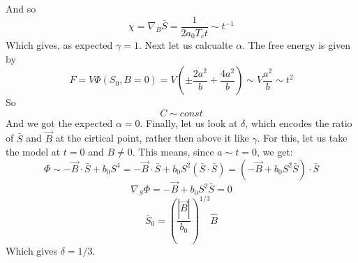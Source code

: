 \documentclass{article}
\begin{document}
And so
\begin{equation}
    \chi = \nabla_{B}\bar{S} = \frac{1}{2a_0T_c t} \sim t^{-1}
\end{equation}
Which gives, as expected $\gamma = 1$. Next let us calcualte $\alpha$. The free energy is given by
\begin{equation}
    F = V \Phi(S_0, B=0) = V\left(\pm \frac{2a^2}{b} + \frac{4a^2}{b}\right) \sim V\frac{a^2}{b} \sim t^2
\end{equation}
So
\begin{equation}
    C \sim const
\end{equation}
And we got the expected $\alpha = 0$. Finally, let us look at $\delta$, which encodes the ratio of $\bar{S}$ and $\vec{B}$ at the cirtical point, rather then above it like $\gamma$. For this, let us take the model at $t = 0$ and $B \ne 0$. This means, since $a \sim t = 0$, we get:
\begin{equation}
    \Phi \sim -\vec{B}\cdot\bar{S} + b_0S^4 = -\vec{B}\cdot\bar{S} + b_0S^2(\bar{S}\cdot\bar{S}) = \left(-\vec{B} + b_0S^2\bar{S}\right)\cdot\bar{S}
\end{equation}
\begin{equation}
    \nabla_S \Phi = -\vec{B} + b_0S^2\bar{S} = 0
\end{equation}
\begin{equation}
    \bar{S}_0 = \left(\frac{|\vec{B}|}{b_0}\right)^{1/3}\hat{B}
\end{equation}
Which gives $\delta = 1/3$.
\end{document}
